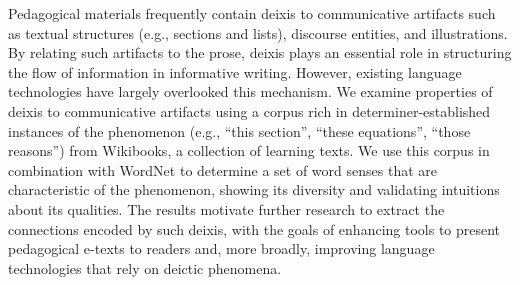 Pedagogical materials frequently contain deixis to communicative artifacts such as textual structures (e.g., sections and lists), discourse entities, and illustrations. By relating such artifacts to the prose, deixis plays an essential role in structuring the flow of information in informative writing. However, existing language technologies have largely overlooked this mechanism. We examine properties of deixis to communicative artifacts using a corpus rich in determiner-established instances of the phenomenon (e.g., ``this section'', ``these equations'', ``those reasons'') from Wikibooks, a collection of learning texts. We use this corpus in combination with WordNet to determine a set of word senses that are characteristic of the phenomenon, showing its diversity and validating intuitions about its qualities. The results motivate further research to extract the connections encoded by such deixis, with the goals of enhancing tools to present pedagogical e-texts to readers and, more broadly, improving language technologies that rely on deictic phenomena.

